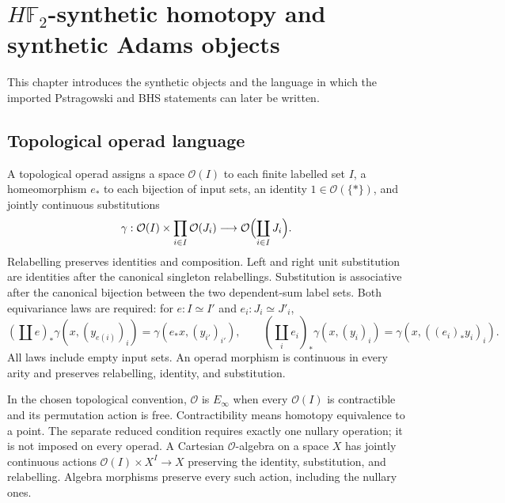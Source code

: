 \chapter{$H\mathbb F_2$-synthetic homotopy and synthetic Adams objects}
\label{chap:synthetic-foundations}

This chapter introduces the synthetic objects and the language in which the imported Pstragowski and BHS statements can later be written.

\section{Topological operad language}

\begin{definition}
  \label{def:topological-operad-foundation}
  \leanok
  A topological operad assigns a space $\mathcal O(I)$ to each finite
  labelled set $I$, a homeomorphism $e_*$ to each bijection of input sets,
  an identity $1\in\mathcal O(\{*\})$, and jointly continuous substitutions
  \[
    \gamma:\mathcal O(I)\times\prod_{i\in I}\mathcal O(J_i)
       \longrightarrow\mathcal O\Bigl(\coprod_{i\in I}J_i\Bigr).
  \]
  Relabelling preserves identities and composition. Left and right unit
  substitution are identities after the canonical singleton relabellings.
  Substitution is associative after the canonical bijection between the
  two dependent-sum label sets. Both equivariance laws are required: for
  $e:I\simeq I'$ and $e_i:J_i\simeq J'_i$,
  \[
    (\coprod e)_*\gamma(x,(y_{e(i)})_i)
       =\gamma(e_*x,(y_{i'})_{i'}),\qquad
    (\coprod_i e_i)_*\gamma(x,(y_i)_i)
       =\gamma(x,((e_i)_*y_i)_i).
  \]
  All laws include empty input sets. An operad morphism is continuous in
  every arity and preserves relabelling, identity, and substitution.

  In the chosen topological convention, $\mathcal O$ is $E_\infty$ when
  every $\mathcal O(I)$ is contractible and its permutation action is free.
  Contractibility means homotopy equivalence to a point. The separate
  reduced condition requires exactly one nullary operation; it is not
  imposed on every operad. A Cartesian $\mathcal O$-algebra on a space $X$
  has jointly continuous actions $\mathcal O(I)\times X^I\to X$ preserving
  the identity, substitution, and relabelling. Algebra morphisms preserve
  every such action, including the nullary ones.
\end{definition}

